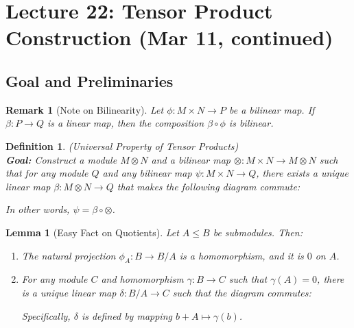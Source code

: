 \documentclass[a4paper,12pt]{article}
\newtheorem{lem}[thm]{Lemma}
\newtheorem{defn}[thm]{Definition}
\newtheorem{rmk}[thm]{Remark}
\begin{document}
\section{Lecture 22: Tensor Product Construction (Mar 11, continued)}
\subsection{Goal and Preliminaries}

\begin{rmk}[Note on Bilinearity]
    Let $\phi: M \times N \to P$ be a bilinear map. If $\beta: P \to Q$ is a linear map, then the composition $\beta \circ \phi$ is bilinear.
\end{rmk}

\begin{defn}
    (Universal Property of Tensor Products)\\
    \textbf{Goal:} Construct a module $M \otimes N$ and a bilinear map $\otimes: M \times N \to M \otimes N$ such that for any module $Q$ and any bilinear map $\psi: M \times N \to Q$, there exists a unique linear map $\beta: M \otimes N \to Q$ that makes the following diagram commute:
    \begin{center}
    \end{center}
    In other words, $\psi = \beta \circ \otimes$.
\end{defn}

\begin{lem}[Easy Fact on Quotients]
    Let $A \leq B$ be submodules. Then:
    \begin{enumerate}
        \item The natural projection $\phi_A: B \to B/A$ is a homomorphism, and it is $0$ on $A$.
        \item For any module $C$ and homomorphism $\gamma: B \to C$ such that $\gamma(A) = 0$, there is a unique linear map $\delta: B/A \to C$ such that the diagram commutes:
        \begin{center}
        \end{center}
        Specifically, $\delta$ is defined by mapping $b + A \mapsto \gamma(b)$.
    \end{enumerate}
\end{lem}
\end{document}
